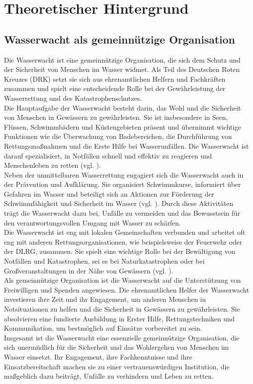 \documentclass[fontsize=12pt,openright,oneside,paper=a4,BCOR=1cm]{scrbook}
\begin{document}
%
%

\chapter{Theoretischer Hintergrund}

\section{Wasserwacht als gemeinnützige Organisation}

Die Wasserwacht ist eine gemeinnützige Organisation, die sich dem Schutz und der Sicherheit von Menschen im Wasser widmet. Als Teil des Deutschen Roten Kreuzes (DRK) setzt sie sich aus ehrenamtlichen Helfern und Fachkräften zusammen und spielt eine entscheidende Rolle bei der Gewährleistung der Wasserrettung und des Katastrophenschutzes. \\
Die Hauptaufgabe der Wasserwacht besteht darin, das Wohl und die Sicherheit von Menschen in Gewässern zu gewährleisten. Sie ist insbesondere in Seen, Flüssen, Schwimmbädern und Küstengebieten präsent und übernimmt wichtige Funktionen wie die Überwachung von Badebereichen, die Durchführung von Rettungsmaßnahmen und die Erste Hilfe bei Wasserunfällen. Die Wasserwacht ist darauf spezialisiert, in Notfällen schnell und effektiv zu reagieren und Menschenleben zu retten (vgl. \cite{drkwasserwacht}). \\
Neben der unmittelbaren Wasserrettung engagiert sich die Wasserwacht auch in der Prävention und Aufklärung. Sie organisiert Schwimmkurse, informiert über Gefahren im Wasser und beteiligt sich an Aktionen zur Förderung der Schwimmfähigkeit und Sicherheit im Wasser (vgl. \cite{drkwasserwachtangebote}). Durch diese Aktivitäten trägt die Wasserwacht dazu bei, Unfälle zu vermeiden und das Bewusstsein für den verantwortungsvollen Umgang mit Wasser zu schärfen. \\
Die Wasserwacht ist eng mit lokalen Gemeinschaften verbunden und arbeitet oft eng mit anderen Rettungsorganisationen, wie beispielsweise der Feuerwehr oder der DLRG, zusammen. Sie spielt eine wichtige Rolle bei der Bewältigung von Notfällen und Katastrophen, sei es bei Naturkatastrophen oder bei Großveranstaltungen in der Nähe von Gewässern (vgl. \cite{brkwasserwacht}). \\
Als gemeinnützige Organisation ist die Wasserwacht auf die Unterstützung von Freiwilligen und Spenden angewiesen. Die ehrenamtlichen Helfer der Wasserwacht investieren ihre Zeit und ihr Engagement, um anderen Menschen in Notsituationen zu helfen und die Sicherheit in Gewässern zu gewährleisten. Sie absolvieren eine fundierte Ausbildung in Erster Hilfe, Rettungstechniken und Kommunikation, um bestmöglich auf Einsätze vorbereitet zu sein. \\ %
Insgesamt ist die Wasserwacht eine essenzielle gemeinnützige Organisation, die sich unermüdlich für die Sicherheit und das Wohlergehen von Menschen im Wasser einsetzt. Ihr Engagement, ihre Fachkenntnisse und ihre Einsatzbereitschaft machen sie zu einer vertrauenswürdigen Institution, die maßgeblich dazu beiträgt, Unfälle zu verhindern und Leben zu retten.
\end{document}
